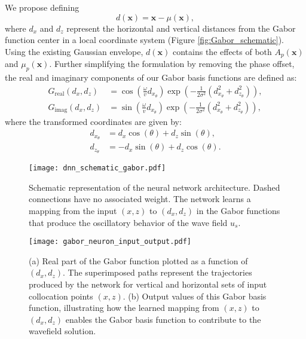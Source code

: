 \documentclass[authoryear, preprint, 12pt]{elsarticle}
\begin{document}
	We propose defining  
	\begin{equation}
		d(\mathbf{x}) = \mathbf{x} - \mu(\mathbf{x}),
	\end{equation}
	where \( d_x \) and \( d_z \) represent the horizontal and vertical distances from the Gabor function center in a local coordinate system (Figure \ref{fig:Gabor_schematic}). Using the existing Gaussian envelope, \( d(\mathbf{x}) \) contains the effects of both \( A_p(\mathbf{x}) \) and \( \mu_p(\mathbf{x}) \).  
	Further simplifying the formulation by removing the phase offset, the real and imaginary components of our Gabor basis functions are defined as:
	\begin{align}
		G_{\text{real}}(d_x, d_z) &= \cos\left( \frac{\omega}{v} d_{x_\theta} \right) 
		\exp\left( -\frac{1}{2\sigma^2} \left( d_{x_\theta}^2 + d_{z_\theta}^2 \right) \right), \\
		G_{\text{imag}}(d_x, d_z) &= \sin\left( \frac{\omega}{v} d_{x_\theta} \right) 
		\exp\left( -\frac{1}{2\sigma^2} \left( d_{x_\theta}^2 + d_{z_\theta}^2 \right) \right),
	\end{align}
	where the transformed coordinates are given by:
	\begin{align}
		d_{x_\theta} &= d_x \cos(\theta) + d_z \sin(\theta), \\
		d_{z_\theta} &= -d_x \sin(\theta) + d_z \cos(\theta).
	\end{align}
	

	\begin{figure}[tb]
		\centering
		\begin{minipage}{0.59\textwidth}
			\centering
			\texttt{[image: dnn\_schematic\_gabor.pdf]}  %
		\end{minipage}
		\caption{Schematic representation of the neural network architecture. Dashed connections have no associated weight. The network learns a mapping from the input \((x,z)\) to \((d_x,d_z)\) in the Gabor functions that produce the oscillatory behavior of the wave field \(u_s\).	}
		\label{fig:NN_architecture}
	\end{figure}
	
	\begin{figure}[htb]
		\centering
		\texttt{[image: gabor\_neuron\_input\_output.pdf]}
		\caption{(a) Real part of the Gabor function plotted as a function of \( (d_x, d_z) \). The superimposed paths represent the trajectories produced by the network for vertical and horizontal sets of input collocation points \( (x, z) \). (b) Output values of this Gabor basis function, illustrating how the learned mapping from \( (x, z) \) to \( (d_x, d_z) \) enables the Gabor basis function to contribute to the wavefield solution.}
		\label{fig:gabor_mapping}
	\end{figure}
	
\end{document}
